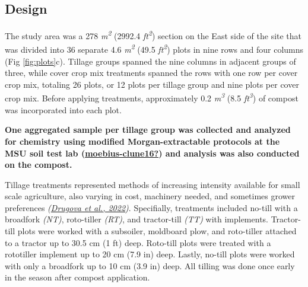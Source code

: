 \documentclass[
  12pt,
]{article}
\begin{document}
\hypertarget{design}{%
\subsection{Design}\label{design}}

The study area was a 278 \emph{m\textsuperscript{2}} (2992.4 \emph{ft\textsuperscript{2}}) section on the East side of the site that was divided into 36 separate 4.6 \emph{m\textsuperscript{2}} (49.5 \emph{ft\textsuperscript{2}}) plots in nine rows and four columns (Fig \ref{fig:plots}c).
Tillage groups spanned the nine columns in adjacent groups of three, while cover crop mix treatments spanned the rows with one row per cover crop mix, totaling 26 plots, or 12 plots per tillage group and nine plots per cover crop mix.
Before applying treatments, approximately 0.2 \emph{m\textsuperscript{3}} (8.5 \emph{ft\textsuperscript{3}}) of compost was incorporated into each plot.

\textbf{One aggregated sample per tillage group was collected and analyzed for chemistry using modified Morgan-extractable protocols at the MSU soil test lab (\protect\hyperlink{ref-moebius-clune16}{\textbf{moebius-clune16?}}) and analysis was also conducted on the compost.}

Tillage treatments represented methods of increasing intensity available for small scale agriculture, also varying in cost, machinery needed, and sometimes grower preferences \emph{(\protect\hyperlink{ref-drugova22}{Drugova et al., 2022})}.
Specifially, treatments included no-till with a broadfork \emph{(NT)}, roto-tiller \emph{(RT)}, and tractor-till \emph{(TT)} with implements.
Tractor-till plots were worked with a subsoiler, moldboard plow, and roto-tiller attached to a tractor up to 30.5 cm (1 ft) deep.
Roto-till plots were treated with a rototiller implement up to 20 cm (7.9 in) deep.
Lastly, no-till plots were worked with only a broadfork up to 10 cm (3.9 in) deep.
All tilling was done once early in the season after compost application.
\end{document}
